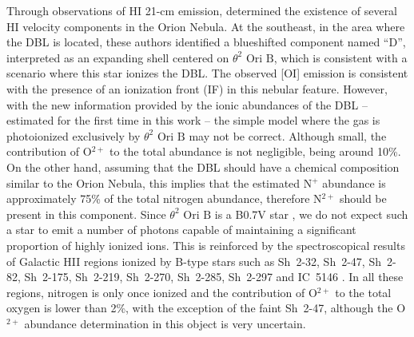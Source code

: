 \documentclass[twocolumn,linenumbers]{aastex63}
\begin{document}
Through observations of H\thinspace I 21-cm emission, \citet{vanderWerf13} determined the existence of several H\thinspace I velocity components in  the Orion Nebula. At the southeast, in the area where the DBL is located, these authors identified a blueshifted component named ``D'', interpreted as an expanding shell centered on $\theta^{2} \text{ Ori B}$, which is consistent with a scenario where this star ionizes the DBL. The observed [O\thinspace I] emission is consistent with the presence of an ionization front (IF) in this nebular feature. However, with the new information provided by the ionic abundances of the DBL -- estimated for the first time in this work -- the simple model where the gas is photoionized exclusively by $\theta^{2} \text{ Ori B}$ may not be correct. Although small, the contribution of O$^{2+}$ to the total abundance is not negligible, being around 10\%. On the other hand, assuming that the DBL should have a chemical composition similar to the Orion Nebula, this implies that the estimated N$^{+}$ abundance is approximately 75\% of the total nitrogen abundance, therefore N$^{2+}$ should be present in this component. Since $\theta^{2} \text{ Ori B}$ is a B0.7V star \citep{simondiaz10}, we do not expect such a star to emit a number of  photons capable of maintaining a significant proportion of highly ionized ions. This is reinforced by the spectroscopical results of Galactic  H\thinspace II regions ionized by B-type stars such as Sh~2-32, Sh~2-47, Sh~2-82, Sh~2-175, Sh~2-219, Sh~2-270, Sh~2-285, Sh~2-297 and IC~5146 \citep{garciarojas14,estebanygarciarojas18,arellanocordova2020B}. In all these regions, nitrogen is only once ionized and the contribution of O$^{2+}$ to the total oxygen is lower than 2\%, with the exception of the faint Sh~2-47, although the O$^{2+}$ abundance determination in this object is very uncertain. 
\end{document}
